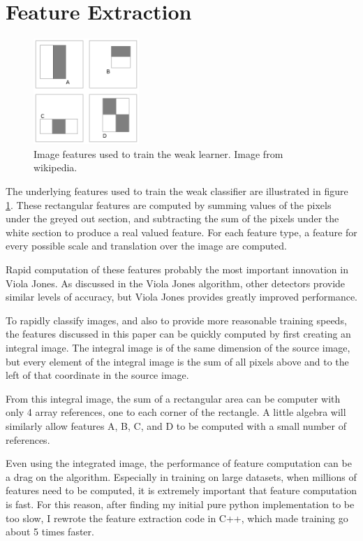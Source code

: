 \documentclass[11pt,twocolumn]{article}
\begin{document}
\section{Feature Extraction}
\label{sec:features}

\begin{figure}
\includegraphics[width=40mm]{features.png}
\caption{Image features used to train the weak learner. Image from wikipedia.}
\label{fig:features}
\end{figure}

The underlying features used to train the weak classifier are
illustrated in figure \ref{fig:features}. These rectangular features are computed by summing
values of the pixels under the greyed out section, and subtracting the
sum of the pixels under the white section to produce a real valued
feature. For each feature type, a feature for every possible scale and
translation over the image are computed.

Rapid computation of these features probably the most important
innovation in Viola Jones. As discussed in the Viola Jones
algorithm\cite{violajones2001}, other detectors provide similar levels of
accuracy, but Viola Jones provides greatly improved performance.

To rapidly classify images, and also to provide more reasonable
training speeds, the features discussed in this paper can be quickly
computed by first creating an integral image. The integral image is of
the same dimension of the source image, but every element of the
integral image is the sum of all pixels above and to the left of that
coordinate in the source image.

From this integral image, the sum of a rectangular area can be
computer with only 4 array references, one to each corner of the
rectangle. A little algebra will similarly allow features A, B, C, and
D to be computed with a small number of references.

Even using the integrated image, the performance of feature
computation can be a drag on the algorithm. Especially in training on
large datasets, when millions of features need to be computed, it is
extremely important that feature computation is fast. For this reason,
after finding my initial pure python implementation to be too slow, I
rewrote the feature extraction code in C++, which made training go
about 5 times faster.
\end{document}
